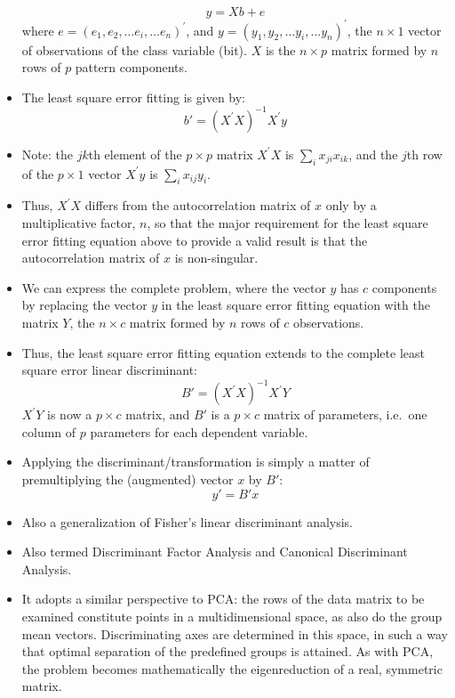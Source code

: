 \documentclass[a4,dvips]{seminar}
\newcommand{\heading}[1]{%
  \begin{center}
    \large\bf
    \shadowbox{#1}%
  \end{center}
  \vspace{1ex minus 1ex}}
\begin{document}
\begin{slide}
\begin{itemize}
$$     y = X b + e $$
      where $e = (e_1, e_2, \dots e_i, \dots e_n)^\prime$, and
            $y = (y_1, y_2, \dots y_i, \dots y_n)^\prime$, 
the $n \times 1$ 
vector of                    
                                        observations of the class
                                        variable (bit).
            $X$ is the $n \times p$ matrix formed by $n$ rows of $p$ pattern
            components.
\item 
The least square error fitting is given by: 
$$b' = (X^\prime X)^{-1} X^\prime y $$
\item Note: the $jk$th element of the $p \times p$ matrix $X^\prime X$ is 
$\sum_i x_{ji} x_{ik}$, and the
$j$th row of the $p \times 1$ vector $X^\prime y$ is 
$\sum_i x_{ij} y_i$. 
\item Thus, $X^\prime X$ differs from
the autocorrelation matrix of $x$ only by a multiplicative factor, $n$, 
so that the major requirement for the least square error fitting equation 
above to provide a
valid result is that the autocorrelation matrix of $x$ is non-singular.
\item We can express the complete problem, where the vector $y$ has $c$
components by replacing the vector $y$ in the least square error fitting
equation with the
matrix $Y$, the $n \times c$ matrix formed by $n$ rows of $c$ observations. 
\item Thus,  the least square error fitting equation extends to the complete 
least square error
linear discriminant:
$$     B' = (X^\prime X)^{-1} X^\prime Y     $$
$X^\prime Y$ is now a $p \times c$ matrix, and $B'$ is a $p \times c$ 
matrix of parameters,
i.e.\ one column of $p$ parameters for each dependent variable.
\item Applying the discriminant/transformation is simply a matter of
premultiplying the (augmented) vector $x$ by $B'$:
$$    y' = B' x  $$
\end{itemize}
\end{slide}

\begin{slide}
\textcolor {reddish} {\heading{Multiple Discriminant Analysis}}
\begin{itemize}
\item Also a generalization of Fisher's linear discriminant analysis.
\item Also termed Discriminant Factor Analysis and Canonical 
Discriminant Analysis. 
\item It adopts
a similar perspective to PCA: the rows of the data matrix to be
examined constitute points in a multidimensional space, as also
do the group mean vectors.  Discriminating axes are determined in
this space, in such a way that optimal separation of the predefined
groups is attained.  As with PCA, the problem becomes mathematically
the eigenreduction of a real, symmetric matrix. 
\end{itemize}
\end{slide}
\end{document}

